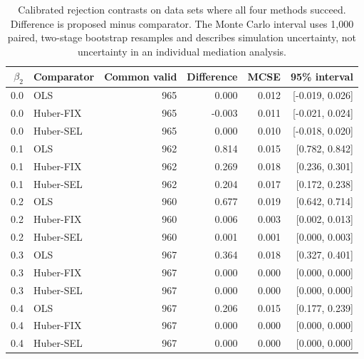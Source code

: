 \begin{table}[htbp]
\centering\small
\caption{Calibrated rejection contrasts on data sets where all four methods succeed. Difference is proposed minus comparator. The Monte Carlo interval uses 1,000 paired, two-stage bootstrap resamples and describes simulation uncertainty, not uncertainty in an individual mediation analysis.}
\label{tab:power-paired}
\begin{tabular}{rlrrrr}
\toprule
$\beta_2$ & Comparator & Common valid & Difference & MCSE & 95\% interval \\ \midrule
0.0 & OLS & 965 & 0.000 & 0.012 & [-0.019, 0.026] \\
0.0 & Huber-FIX & 965 & -0.003 & 0.011 & [-0.021, 0.024] \\
0.0 & Huber-SEL & 965 & 0.000 & 0.010 & [-0.018, 0.020] \\
\midrule
0.1 & OLS & 962 & 0.814 & 0.015 & [0.782, 0.842] \\
0.1 & Huber-FIX & 962 & 0.269 & 0.018 & [0.236, 0.301] \\
0.1 & Huber-SEL & 962 & 0.204 & 0.017 & [0.172, 0.238] \\
\midrule
0.2 & OLS & 960 & 0.677 & 0.019 & [0.642, 0.714] \\
0.2 & Huber-FIX & 960 & 0.006 & 0.003 & [0.002, 0.013] \\
0.2 & Huber-SEL & 960 & 0.001 & 0.001 & [0.000, 0.003] \\
\midrule
0.3 & OLS & 967 & 0.364 & 0.018 & [0.327, 0.401] \\
0.3 & Huber-FIX & 967 & 0.000 & 0.000 & [0.000, 0.000] \\
0.3 & Huber-SEL & 967 & 0.000 & 0.000 & [0.000, 0.000] \\
\midrule
0.4 & OLS & 967 & 0.206 & 0.015 & [0.177, 0.239] \\
0.4 & Huber-FIX & 967 & 0.000 & 0.000 & [0.000, 0.000] \\
0.4 & Huber-SEL & 967 & 0.000 & 0.000 & [0.000, 0.000] \\
\bottomrule\end{tabular}
\end{table}
